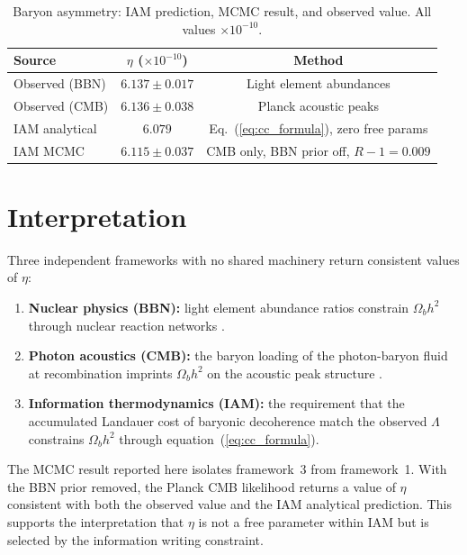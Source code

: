 \documentclass[12pt,a4paper]{article}
\begin{document}
\begin{table}[h]
\centering
\caption{Baryon asymmetry: IAM prediction, MCMC result, and
observed value. All values $\times 10^{-10}$.}
\begin{tabular}{lcc}
\toprule
Source & $\eta$ ($\times 10^{-10}$) & Method \\
\midrule
Observed (BBN) & $6.137 \pm 0.017$ & Light element abundances \\
Observed (CMB) & $6.136 \pm 0.038$ & Planck acoustic peaks \\
IAM analytical & $6.079$ & Eq.~(\ref{eq:cc_formula}), zero free params \\
IAM MCMC & $6.115 \pm 0.037$ & CMB only, BBN prior off, $R-1=0.009$ \\
\bottomrule
\end{tabular}
\label{tab:result}
\end{table}

\section{Interpretation}
\label{sec:interpretation}

Three independent frameworks with no shared machinery return
consistent values of $\eta$:

\begin{enumerate}
\item \textbf{Nuclear physics (BBN):} light element abundance ratios
constrain $\Omega_b h^2$ through nuclear reaction networks
\citep{cyburt2016}.
\item \textbf{Photon acoustics (CMB):} the baryon loading of the
photon-baryon fluid at recombination imprints $\Omega_b h^2$ on
the acoustic peak structure \citep{planck2020}.
\item \textbf{Information thermodynamics (IAM):} the requirement that
the accumulated Landauer cost of baryonic decoherence match the
observed $\Lambda$ constrains $\Omega_b h^2$ through
equation~(\ref{eq:cc_formula}).
\end{enumerate}

The MCMC result reported here isolates framework~3 from
framework~1. With the BBN prior removed, the Planck CMB
likelihood returns a value of $\eta$ consistent with both the
observed value and the IAM analytical prediction. This supports
the interpretation that $\eta$ is not a free parameter within
IAM but is selected by the information writing constraint.
\end{document}
